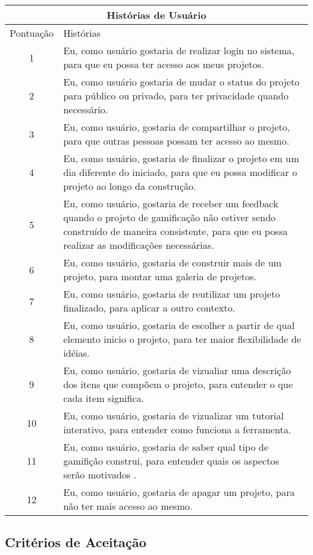 \begin{tabular}{|c|l|}

\hline
\multicolumn{2}{|c}{\textbf{Histórias de Usuário}}\\ \hline
Pontuação & Histórias \\ \hline
1 & Eu, como usuário gostaria de realizar login no sistema, para que eu possa ter acesso aos meus projetos.\\ \hline
2 & Eu, como usuário gostaria de mudar o status do projeto para público ou privado,  para ter privacidade quando necessário.\\ \hline
3 & Eu, como usuário, gostaria de compartilhar o projeto, para que outras pessoas possam ter acesso ao mesmo.\\ \hline
4 & Eu, como usuário, gostaria de finalizar o projeto em um dia diferente do iniciado, para que eu possa modificar o projeto ao longo da construção. \\ \hline
5 & Eu, como usuário, gostaria de receber um feedback quando o projeto de gamificação não estiver sendo construído de maneira consistente, para que eu possa realizar as modificações necessárias.\\ \hline
6 & Eu, como usuário, gostaria de construir mais de um projeto, para montar uma galeria de projetos.\\  \hline
7 & Eu, como usuário, gostaria de reutilizar um projeto finalizado, para aplicar a outro contexto.\\ \hline
8 & Eu, como usuário, gostaria de escolher a partir de qual elemento inicio o projeto, para ter maior flexibilidade de idéias.\\ \hline
9 & Eu, como usuário, gostaria de vizualiar uma descrição dos itens que compõem o projeto, para entender o que cada item significa.\\ \hline
10 & Eu, como usuário, gostaria de vizualizar um tutorial interativo, para entender como funciona a ferramenta.\\ \hline
11 & Eu, como usuário, gostaria de saber qual tipo de gamifição construi, para entender quais os aspectos serão motivados .\\ \hline
12 & Eu, como usuário, gostaria de apagar um projeto, para não ter mais acesso ao mesmo.\\ \hline
\end{tabular}

\subsection{Critérios de Aceitação}


